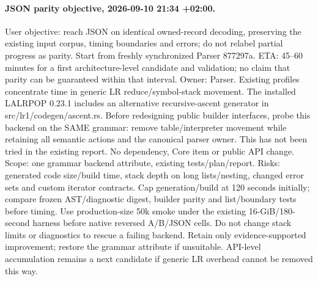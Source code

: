 \documentclass[11pt,a4paper]{article}
\begin{document}
\paragraph{JSON parity objective, 2026-09-10 21:34 +02:00.}
User objective: reach JSON on identical owned-record decoding, preserving the
existing input corpus, timing boundaries and errors; do not relabel partial
progress as parity. Start from freshly synchronized Parser 877297a.
ETA: 45--60 minutes for a first architecture-level candidate and validation;
no claim that parity can be guaranteed within that interval. Owner: Parser.
Existing profiles concentrate time in generic LR reduce/symbol-stack movement.
The installed LALRPOP 0.23.1 includes an alternative recursive-ascent generator
in src/lr1/codegen/ascent.rs. Before redesigning public builder interfaces,
probe this backend on the SAME grammar: remove table/interpreter movement while
retaining all semantic actions and the canonical parser owner. This has not
been tried in the existing report. No dependency, Core item or public API change.
Scope: one grammar backend attribute, existing tests/plan/report. Risks: generated
code size/build time, stack depth on long lists/nesting, changed error sets and
custom iterator contracts. Cap generation/build at 120 seconds initially; compare
frozen AST/diagnostic digest, builder parity and list/boundary tests before timing.
Use production-size 50k smoke under the existing 16-GiB/180-second harness before
native reversed A/B/JSON cells. Do not change stack limits or diagnostics to
rescue a failing backend. Retain only evidence-supported improvement; restore
the grammar attribute if unsuitable. API-level accumulation remains a next
candidate if generic LR overhead cannot be removed this way.
\end{document}
